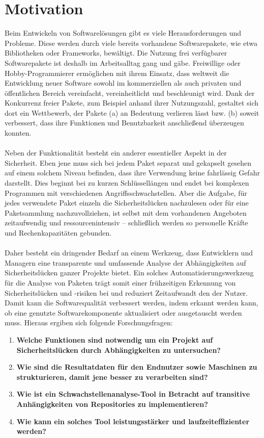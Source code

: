 \section{Motivation} \label{subsec:Motivation}
    Beim Entwickeln von Softwarelösungen gibt es viele Herausforderungen und Probleme. 
    Diese werden durch viele bereits vorhandene Softwarepakete, wie etwa Bibliotheken oder Frameworks, bewältigt.
    Die Nutzung frei verfügbarer Softwarepakete ist deshalb im Arbeitsalltag gang und gäbe.
    Freiwillige oder Hobby-Programmierer ermöglichen mit ihrem Einsatz, dass weltweit die Entwicklung neuer Software sowohl im kommerziellen als auch privaten und öffentlichen Bereich vereinfacht, vereinheitlicht und beschleunigt wird.
    Dank der Konkurrenz freier Pakete, zum Beispiel anhand ihrer Nutzungszahl, gestaltet sich dort ein Wettbewerb, der Pakete (a) an Bedeutung verlieren lässt bzw. (b) soweit verbessert, dass ihre Funktionen und Benutzbarkeit anschließend überzeugen konnten.
    \\ \\
    Neben der Funktionalität besteht ein anderer essentieller Aspekt in der Sicherheit.
    Eben jene muss sich bei jedem Paket separat und gekapselt gesehen auf einem solchem Niveau befinden, dass ihre Verwendung keine fahrlässig Gefahr darstellt.
    Dies beginnt bei zu kurzen Schlüssellängen und endet bei komplexen Programmen mit verschiedenen Angriffsschwachstellen.
    Aber die Aufgabe, für jedes verwendete Paket einzeln die Sicherheitslücken nachzulesen oder für eine Paketsammlung nachzuvollziehen, ist selbst mit dem vorhandenen Angeboten zeitaufwendig und ressourcenintensiv -- schließlich werden so personelle Kräfte und Rechenkapazitäten gebunden.
    \\ \\
    Daher besteht ein dringender Bedarf an einem Werkzeug, dass Entwicklern und Managern eine transparente und umfassende Analyse der Abhängigkeiten auf Sicherheitslücken ganzer Projekte bietet.
    Ein solches Automatisierungswerkzeug für die Analyse von Paketen trägt somit einer frühzeitigen Erkennung von Sicherheitslücken und -risiken bei und reduziert Zeitaufwandt den der Nutzer.
    Damit kann die Softwarequalität verbessert werden, indem erkannt werden kann, ob eine genutzte Softwarekomponente aktualisiert oder ausgetauscht werden muss.
    Hieraus ergiben sich folgende Forschungsfragen:
    \begin{enumerate}
        \item \textbf{Welche Funktionen sind notwendig um ein Projekt auf Sicherheitslücken durch Abhängigkeiten zu untersuchen?} \label{one}
        \item \textbf{Wie sind die Resultatdaten für den Endnutzer sowie Maschinen zu strukturieren, damit jene besser zu verarbeiten sind?} \label{two}
        \item \textbf{Wie ist ein Schwachstellenanalyse-Tool in Betracht auf transitive Anhängigkeiten von Repositories zu implementieren?} \label{three}
        \item \textbf{Wie kann ein solches Tool leistungsstärker und laufzeiteffizienter werden?} \label{four}
    \end{enumerate}
